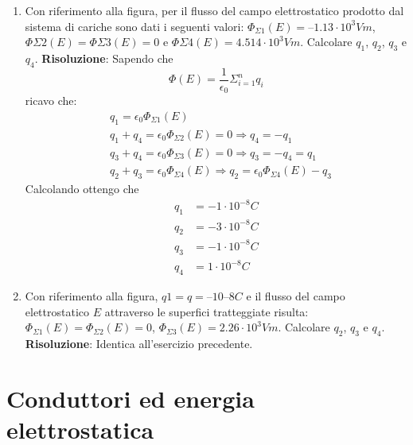 \documentclass{book}
\begin{document}
\begin{enumerate}
    \item Con riferimento alla figura, per il flusso del campo elettrostatico prodotto dal sistema di cariche sono dati i seguenti valori: $\Phi_{\Sigma1}(E) = –1.13 \cdot 10^3 Vm$, $\Phi{\Sigma2}(E) = \Phi{\Sigma3}(E) = 0$ e $\Phi{\Sigma4}(E) = 4.514 \cdot 10^3 Vm$. Calcolare $q_1$, $q_2$, $q_3$ e $q_4$.
    \newline 
    \textbf{Risoluzione}: Sapendo che $$\Phi(E) = \frac{1}{\epsilon_0}\Sigma_{i=1}^{n}q_i$$ ricavo che:
    \begin{align*}
        & q_1 = \epsilon_0 \Phi_{\Sigma1}(E) \\
        & q_1 + q_4 = \epsilon_0 \Phi_{\Sigma2}(E) = 0 \Rightarrow q_4 = -q_1 \\
        & q_3 + q_4 = \epsilon_0 \Phi_{\Sigma3}(E) = 0 \Rightarrow q_3 = -q_4 = q_1 \\
        & q_2 + q_3 = \epsilon_0 \Phi_{\Sigma4}(E) \Rightarrow q_2 = \epsilon_0 \Phi_{\Sigma4}(E) - q_3
    \end{align*}
    Calcolando ottengo che 
    \begin{align*}
        q_1 & = -1 \cdot 10^{-8}C \\
        q_2 & = -3 \cdot 10^{-8}C \\
        q_3 & = -1 \cdot 10^{-8}C \\
        q_4 & =  1 \cdot 10^{-8}C
    \end{align*}
    

    \item Con riferimento alla figura, $q1 = q = –10–8 C$ e il flusso del campo elettrostatico $E$ attraverso le superfici tratteggiate risulta: $\Phi_{\Sigma1}(E) = \Phi_{\Sigma2}(E) = 0$, $\Phi_{\Sigma3}(E) = 2.26 \cdot 10^3 Vm$. Calcolare $q_2$, $q_3$ e $q_4$.
    \newline 
    \textbf{Risoluzione}: Identica all'esercizio precedente.

\end{enumerate}



\chapter{Conduttori ed energia elettrostatica}
\end{document}
